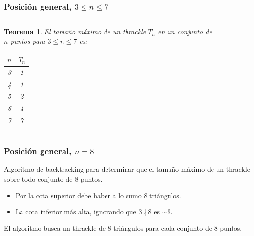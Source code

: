 \documentclass{beamer}
\newtheorem{teo}{Teorema}
\begin{document}
\begin{frame}
  \frametitle{Posición general, $3\le n\le 7$}
  \begin{columns}
      \hspace{0.1cm}
    \begin{column}{0.45\textwidth}
      \begin{teo}
        El tamaño máximo de un thrackle $T_n$ en un conjunto de $n$
        puntos para $3\le n\le 7$ es:

        \vspace{0.5cm}
        \centering
        \begin{tabular}{| c | c |}
          \hline
          \textbf{$n$} & \textbf{$T_n$} \\ \hline
          3 & 1 \\ \hline 
          4 & 1 \\ \hline
          5 & 2 \\ \hline
          6 & 4 \\ \hline
          7 & 7 \\ \hline
        \end{tabular}
        \vspace{0.5cm}
      \end{teo}
    \end{column}
    \hfill
    \begin{column}{0.5\textwidth}
      \begin{center}
      \begin{figure}[htb]
        \centering
        
      \end{figure}
      \end{center}
    \end{column}
  \end{columns}
\end{frame}

\begin{frame}
  \frametitle{Posición general, $n=8$}
  Algoritmo de backtracking para determinar que el tamaño máximo de un thrackle
  sobre todo conjunto de 8 puntos.
  \begin{itemize}
    \item Por la cota superior debe haber a lo sumo 8 triángulos.
    \item La cota inferior más alta, ignorando que $3\nmid8$ es $\sim8$.
  \end{itemize}
  \vspace{0.3cm}
  El algoritmo busca un thrackle de 8 triángulos para cada conjunto de 8
  puntos.
\end{frame}
\end{document}
